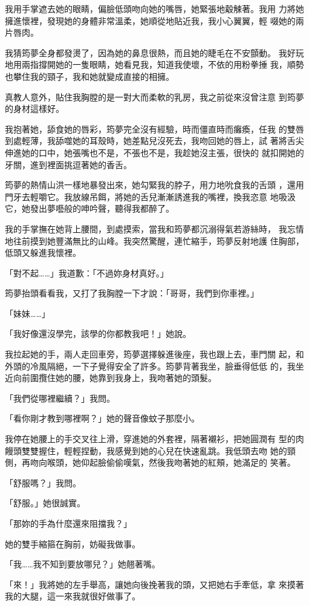 我用手掌遮去她的眼睛，偏臉低頭吻向她的嘴唇，她緊張地觳觫著。我用
力將她擁進懷裡，發現她的身體非常溫柔，她順從地貼近我，我小心翼翼，輕
啜她的兩片唇肉。

我猜筠夢全身都發燙了，因為她的鼻息很熱，而且她的睫毛在不安顫動。
我好玩地用兩指撐開她的一隻眼睛，她看見我，知道我使壞，不依的用粉拳捶
我，順勢也攀住我的頸子，我和她就變成直接的相擁。

真教人意外，貼住我胸膛的是一對大而柔軟的乳房，我之前從來沒曾注意
到筠夢的身材這樣好。

我抱著她，舔食她的唇彩，筠夢完全沒有經驗，時而僵直時而癱瘓，任我
的雙唇到處輕薄，我舔噬她的耳殼時，她差點兒沒死去，我吻回她的唇上，試
著將舌尖伸進她的口中，她張嘴也不是，不張也不是，我趁她沒主張，很快的
就扣開她的牙關，進到裡面挑逗著她的香舌。

筠夢的熱情山洪一樣地暴發出來，她勾緊我的脖子，用力地吮食我的舌頭
，還用門牙去輕嚼它。我放線吊餌，將她的舌兒漸漸誘進我的嘴裡，換我恣意
地吸汲它，她發出夢囈般的呻吟聲，聽得我都醉了。

我的手掌撫在她背上腰間，到處摸索，當我和筠夢都沉溺得氣若游絲時，
我忘情地往前摸到她豐滿無比的山峰。我突然驚醒，連忙縮手，筠夢反射地護
住胸部，低頭又躲進我懷裡。

「對不起……」我道歉：「不過妳身材真好。」

筠夢抬頭看看我，又打了我胸膛一下才說：「哥哥，我們到你車裡。」

「妹妹……」

「我好像還沒學完，該學的你都教我吧！」她說。

我拉起她的手，兩人走回車旁，筠夢選擇躲進後座，我也跟上去，車門關
起，和外頭的冷風隔絕，一下子覺得安全了許多。筠夢背著我坐，臉垂得低低
的，我坐近向前圍攬住她的腰，她靠到我身上，我吻著她的頭髮。

「我們從哪裡繼續？」我問。

「看你剛才教到哪裡啊？」她的聲音像蚊子那麼小。

我停在她腰上的手交叉往上滑，穿進她的外套裡，隔著襯衫，把她圓潤有
型的肉饅頭雙雙握住，輕輕捏動，我感覺到她的心兒在快速亂跳。我低頭去吻
她的頸側，再吻向喉頭，她仰起臉偷偷嘆氣，然後我吻著她的紅頰，她滿足的
笑著。

「舒服嗎？」我問。

「舒服。」她很誠實。

「那妳的手為什麼還來阻擋我？」

她的雙手縮箍在胸前，妨礙我做事。

「我……我不知到要放哪兒？」她翹著嘴。

「來！」我將她的左手舉高，讓她向後挽著我的頭，又把她右手牽低，拿
來摸著我的大腿，這一來我就很好做事了。


